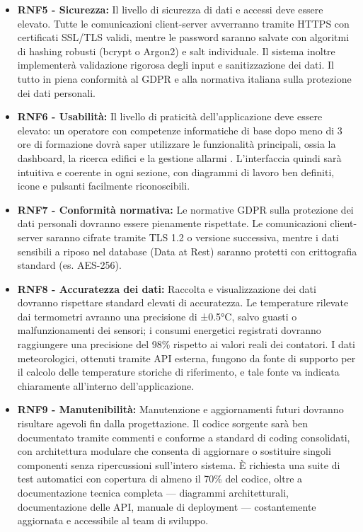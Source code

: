 \begin{itemize}
    \item \textbf{RNF5 - Sicurezza:} Il livello di sicurezza di dati e accessi deve essere elevato. Tutte le comunicazioni client-server avverranno tramite HTTPS con certificati SSL/TLS validi, mentre le password saranno salvate con algoritmi di hashing robusti (bcrypt o Argon2) e salt individuale. Il sistema inoltre implementerà validazione rigorosa degli input e sanitizzazione dei dati. Il tutto in piena conformità al GDPR e alla normativa italiana sulla protezione dei dati personali.

    \item \textbf{RNF6 - Usabilità:} Il livello di praticità dell'applicazione deve essere elevato: un operatore con competenze informatiche di base dopo meno di 3 ore di formazione dovrà saper utilizzare le funzionalità principali, ossia la dashboard, la ricerca edifici e la gestione allarmi . L'interfaccia quindi sarà intuitiva e coerente in ogni sezione, con diagrammi di lavoro ben definiti, icone e pulsanti facilmente riconoscibili.

    \item \textbf{RNF7 - Conformità normativa:} Le normative GDPR sulla protezione dei dati personali dovranno essere pienamente rispettate. Le comunicazioni client-server saranno cifrate tramite TLS 1.2 o versione successiva, mentre i dati sensibili a riposo nel database (Data at Rest) saranno protetti con crittografia standard (es. AES-256).

    \item \textbf{RNF8 - Accuratezza dei dati:} Raccolta e visualizzazione dei dati dovranno rispettare standard elevati di accuratezza. Le temperature rilevate dai termometri avranno una precisione di ±0.5°C, salvo guasti o malfunzionamenti dei sensori; i consumi energetici registrati dovranno raggiungere una precisione del 98\% rispetto ai valori reali dei contatori. I dati meteorologici, ottenuti tramite API esterna, fungono da fonte di supporto per il calcolo delle temperature storiche di riferimento, e tale fonte va indicata chiaramente all'interno dell'applicazione.

    \item \textbf{RNF9 - Manutenibilità:} Manutenzione e aggiornamenti futuri dovranno risultare agevoli fin dalla progettazione. Il codice sorgente sarà ben documentato tramite commenti e conforme a standard di coding consolidati, con architettura modulare che consenta di aggiornare o sostituire singoli componenti senza ripercussioni sull'intero sistema. È richiesta una suite di test automatici con copertura di almeno il 70\% del codice, oltre a documentazione tecnica completa — diagrammi architetturali, documentazione delle API, manuale di deployment — costantemente aggiornata e accessibile al team di sviluppo.
    
\end{itemize}